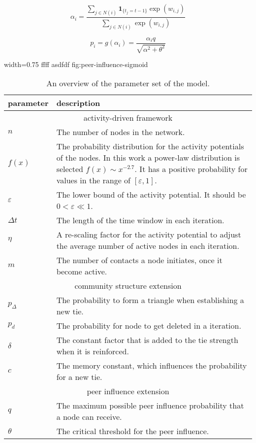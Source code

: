 \begin{equation}
    \alpha_{i} = \frac{\sum_{j \in N(i)} \mathbf{1}_{\{t_{j} = t-1\}} \exp(w_{i, j})}{\sum_{j \in N(i)} \exp(w_{i, j})}
\end{equation}


\begin{equation}
    p_{i} = g(\alpha_{i}) = \frac{\alpha_{i} q}{\sqrt{\alpha^{2} + \theta^2}}
\end{equation}


      {width=0.75\textwidth}
      {ffff}
      {asdfdf}
      {fig:peer-influence-sigmoid}


\begin{table}[]
\centering
\begin{tabular}{lp{10cm}}
\hline
\textbf{parameter} & \textbf{description} \\ \hline \hline
\multicolumn{2}{c}{activity-driven framework} \\ \hline
\( n \) & The number of nodes in the network. \\
\( f(x) \) & The probability distribution for the activity potentials of the nodes. In this work a power-law distribution is selected \( f(x) \sim x^{-2.7} \). It has a positive probability for values in the range of \( [\varepsilon, 1] \). \\
\( \varepsilon \) &  The lower bound of the activity potential. It should be \( 0 < \varepsilon \ll 1 \). \\
\( \Delta t \) &  The length of the time window in each iteration. \\
\( \eta \) &  A re-scaling factor for the activity potential to adjust the average number of active nodes in each iteration. \\
\( m \) & The number of contacts a node initiates, once it become active. \\ \hline \hline

\multicolumn{2}{c}{community structure extension} \\ \hline
\( p_{\Delta} \) & The probability to form a triangle when establishing a new tie. \\
\( p_{d} \) & The probability for node to get deleted in a iteration. \\
\( \delta \) & The constant factor that is added to the tie strength when it is reinforced. \\
\( c \) &  The memory constant, which influences the probability for a new tie.\\ \hline \hline

\multicolumn{2}{c}{peer influence extension} \\
\( q \) & The maximum possible peer influence probability that a node can receive. \\
\( \theta \) & The critical threshold for the peer influence.  \\ \hline
\end{tabular}

\caption{An overview of the parameter set of the model.}
\label{tbl:all-model-parameter}
\end{table}
